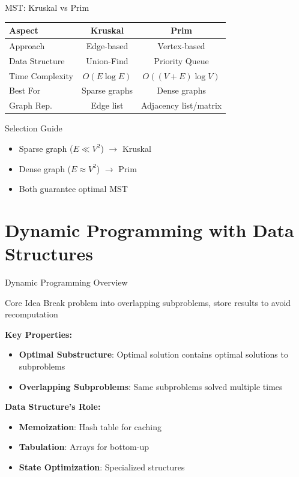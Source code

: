 \documentclass[aspectratio=169,xcolor=dvipsnames]{beamer}
\begin{document}
\begin{frame}{MST: Kruskal vs Prim}
  \begin{table}
    \centering
    \begin{tabular}{lcc}
      \hline
      \textbf{Aspect} & \textbf{Kruskal} & \textbf{Prim} \\
      \hline
      Approach & Edge-based & Vertex-based \\
      Data Structure & Union-Find & Priority Queue \\
      Time Complexity & $O(E \log E)$ & $O((V+E) \log V)$ \\
      Best For & Sparse graphs & Dense graphs \\
      Graph Rep. & Edge list & Adjacency list/matrix \\
      \hline
    \end{tabular}
  \end{table}

  \vspace{0.3cm}
  \begin{block}{Selection Guide}
    \begin{itemize}
      \item Sparse graph ($E \ll V^2$) $\to$ Kruskal
      \item Dense graph ($E \approx V^2$) $\to$ Prim
      \item Both guarantee optimal MST
    \end{itemize}
  \end{block}
\end{frame}

\section{Dynamic Programming with Data Structures}

\begin{frame}{Dynamic Programming Overview}
  \begin{block}{Core Idea}
    Break problem into overlapping subproblems, store results to avoid recomputation
  \end{block}

  \vspace{0.3cm}
  \textbf{Key Properties:}
  \begin{itemize}
    \item \textbf{Optimal Substructure}: Optimal solution contains optimal solutions to subproblems
    \item \textbf{Overlapping Subproblems}: Same subproblems solved multiple times
  \end{itemize}

  \vspace{0.3cm}
  \textbf{Data Structure's Role:}
  \begin{itemize}
    \item \textbf{Memoization}: Hash table for caching
    \item \textbf{Tabulation}: Arrays for bottom-up
    \item \textbf{State Optimization}: Specialized structures
  \end{itemize}
\end{frame}
\end{document}
